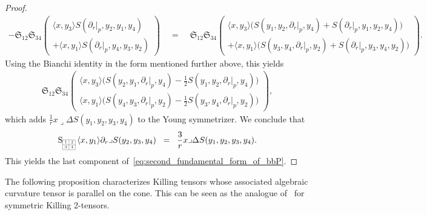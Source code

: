 \documentclass[11pt,a4paper]{article}
\theoremstyle{plain}
\theoremstyle{remark}
\newcommand{\cyclic}{\mathfrak{S}}
\newcommand{\rmS}{\mathrm{S}}
\begin{document}
\begin{proof}
\begin{align*}
- \cyclic_{12}\cyclic_{34} \left ( \begin{array}{c}
\langle x,y_3\rangle S(\partial_r|_p,y_2,y_1,y_4)\\
+ \langle x,y_1\rangle S(\partial_r|_p,y_4,y_3,y_2)
\end{array}\right ) &\;\;=\;\;& \cyclic_{12}\cyclic_{34} \left ( \begin{array}{c}
\langle x,y_3 \rangle\big ( S(y_1,y_2,\partial_r|_p,y_4) + S(\partial_r|_p,y_1,y_2,y_4)\big )\\
+ \langle x,y_1\rangle \big (S(y_3,y_4,\partial_r|_p,y_2) + S(\partial_r|_p,y_3,y_4,y_2)\big )
\end{array}\right ).
\end{align*}
Using the Bianchi identity in the form mentioned further above, this yields
\begin{align*}
\cyclic_{12}\cyclic_{34} \left ( \begin{array}{c}
\langle x,y_3 \rangle\big ( S(y_2,y_1,\partial_r|_p,y_4) - \frac{1}{2}S(y_1,y_2,\partial_r|_p,y_4)\big )\\
\langle x,y_1\rangle \big (S(y_4,y_3,\partial_r|_p,y_2) - \frac{1}{2} S(y_3,y_4,\partial_r|_p,y_2)\big )
\end{array}\right ),
\end{align*}
which adds  $\frac{1}{r}x\lrcorner \Delta S(y_1,y_2,y_3,y_4)$ to the Young symmetrizer. We conclude that 
\begin{align*}
\rmS_{\scaleto{\begin{array}{|c|c|}
\cline{1-2}
1 & 2 \\
\cline{1-2}
3 & 4 \\
\cline{1-2} 
\end{array}}{12pt}}\,\langle x, y_1 \rangle \partial_r\lrcorner S(y_2,y_3,y_4)\;\;=\;\;\frac{3}{r}x\lrcorner \Delta S(y_1,y_2,y_3,y_4).
\end{align*}
This yields the last component of~\eqref{eq:second_fundamental_form_of_bbP}.
\end{proof}



The following proposition characterizes Killing tensors whose associated
algebraic curvature tensor is parallel on the cone. This can be seen as
the analogue of~\cite[Lemma~3.2.1]{Se} for symmetric Killing 2-tensors.
\end{document}
